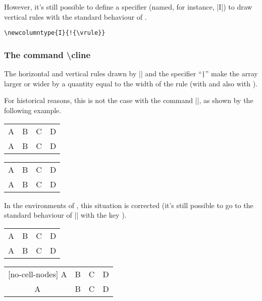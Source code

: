 \documentclass[dvipsnames]{article}%
\begin{document}
\bigskip
However, it's still possible to define a specifier (named, for instance, |I|)
to draw vertical rules with the standard behaviour of .

\begin{Verbatim}
\newcolumntype{I}{!{\vrule}}
\end{Verbatim}


\bigskip
\subsubsection{The command \textbackslash cline}

\label{remark-cline}

The horizontal and vertical rules drawn by |\hline| and the specifier
``\verb+|+'' make the array larger or wider by a quantity equal to the width
of the rule (with  and also with ).

\smallskip
For historical reasons, this is not the case with the command |\cline|, as
shown by the following example.

\medskip
\begin{Code}[width=10cm]
\setlength{\arrayrulewidth}{2pt}
\begin{tabular}{cccc} \hline
A&B&C&D \\ \emph{\cline{2-2}}
A&B&C&D \\ \hline
\end{tabular}
\end{Code}
\begin{scope}
\setlength{\arrayrulewidth}{2pt}
\begin{tabular}[c]{cccc}
\hline
A&B&C&D \\
\cline{2-2}
A&B&C&D \\
\hline
\end{tabular}
\end{scope}

\medskip
{}
In the environments of , this situation is corrected (it's
still possible to go to the standard behaviour of |\cline| with the key
). 

\medskip
\begin{Code}[width=10cm]
\setlength{\arrayrulewidth}{2pt}
\begin{NiceTabular}{cccc} \hline
A&B&C&D \\ \emph{}
A&B&C&D \\ \hline
\end{NiceTabular}
\end{Code}
\begin{scope}
\setlength{\arrayrulewidth}{2pt}
\begin{NiceTabular}[c]{cccc}[no-cell-nodes]
\hline
A&B&C&D \\ 
A&B&C&D \\ \hline
\end{NiceTabular}
\end{scope}
\end{document}
